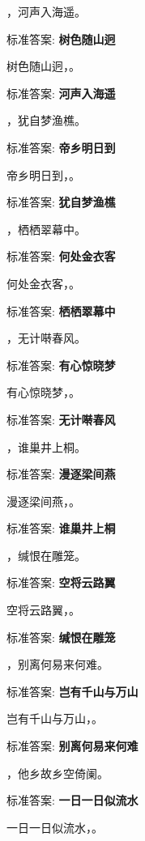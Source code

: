\documentclass[12pt, a4paper, addpoints]{exam}
\begin{document}
\begin{questions}
\question[1] \uline{\qquad\qquad\qquad}，河声入海遥。

标准答案: \textbf{树色随山迥}

\question[1] 树色随山迥，\uline{\qquad\qquad\qquad}。

标准答案: \textbf{河声入海遥}

\question[1] \uline{\qquad\qquad\qquad}，犹自梦渔樵。

标准答案: \textbf{帝乡明日到}

\question[1] 帝乡明日到，\uline{\qquad\qquad\qquad}。

标准答案: \textbf{犹自梦渔樵}

\question[1] \uline{\qquad\qquad\qquad}，栖栖翠幕中。

标准答案: \textbf{何处金衣客}

\question[1] 何处金衣客，\uline{\qquad\qquad\qquad}。

标准答案: \textbf{栖栖翠幕中}

\question[1] \uline{\qquad\qquad\qquad}，无计啭春风。

标准答案: \textbf{有心惊晓梦}

\question[1] 有心惊晓梦，\uline{\qquad\qquad\qquad}。

标准答案: \textbf{无计啭春风}

\question[1] \uline{\qquad\qquad\qquad}，谁巢井上桐。

标准答案: \textbf{漫逐梁间燕}

\question[1] 漫逐梁间燕，\uline{\qquad\qquad\qquad}。

标准答案: \textbf{谁巢井上桐}

\question[1] \uline{\qquad\qquad\qquad}，缄恨在雕笼。

标准答案: \textbf{空将云路翼}

\question[1] 空将云路翼，\uline{\qquad\qquad\qquad}。

标准答案: \textbf{缄恨在雕笼}

\question[1] \uline{\qquad\qquad\qquad}，别离何易来何难。

标准答案: \textbf{岂有千山与万山}

\question[1] 岂有千山与万山，\uline{\qquad\qquad\qquad}。

标准答案: \textbf{别离何易来何难}

\question[1] \uline{\qquad\qquad\qquad}，他乡故乡空倚阑。

标准答案: \textbf{一日一日似流水}

\question[1] 一日一日似流水，\uline{\qquad\qquad\qquad}。


\end{questions}
\end{document}
